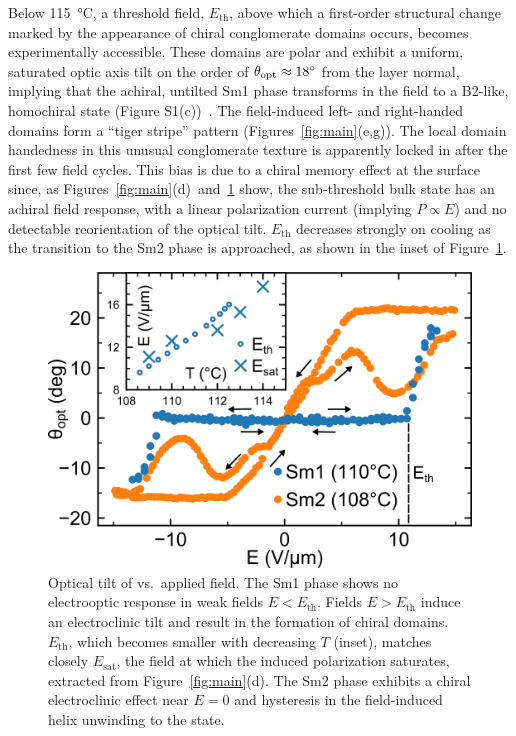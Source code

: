 Below \SI{115}{\degreeCelsius}, a threshold field, $E_\text{th}$, above which a first-order structural change marked by the appearance of chiral conglomerate domains occurs, becomes experimentally accessible.
These domains are polar and exhibit a uniform, saturated optic axis tilt on the
order of $\theta_{\rm opt} \approx \SI{18}{\degree}$ from the layer normal, implying that the achiral, untilted Sm1 phase
transforms in the field to a B2-like, homochiral  state (Figure
S1(c))~\cite{eremin2008electrically}. The field-induced left- and right-handed domains form a ``tiger stripe''
pattern (Figures~\ref{fig:main}(e,g)). The local domain handedness in this unusual conglomerate texture 
is apparently locked in after the first few field cycles.  This bias is due to a chiral
memory effect at the surface since, as
Figures~\ref{fig:main}(d)~and~\ref{fig:threshold} show, the
sub-threshold bulk state has an achiral field response, with a linear polarization current (implying $P \propto E$) and no
detectable reorientation of the optical tilt.
$E_\text{th}$  decreases strongly on cooling as the transition to the Sm2 phase is approached, as shown in the inset of Figure~\ref{fig:threshold}.
%
\begin{figure}[h]
    \includegraphics[width=\columnwidth]{./figs/pal30/finalFigs/threshold-inset2.png}
    \caption{\label{fig:threshold}
        Optical tilt of  vs.\ applied field. The Sm1
        phase shows no electrooptic response in weak fields $E<E_\text{th}$. Fields $E>E_\text{th}$ induce an electroclinic
        tilt and result in the formation of chiral domains.
        $E_\text{th}$, which becomes smaller with decreasing $T$ (inset), matches
        closely $E_\text{sat}$, the field at which the induced
        polarization saturates, extracted from Figure~\ref{fig:main}(d).
        The Sm2 phase exhibits a chiral
        electroclinic effect near $E=0$ and hysteresis in the field-induced helix unwinding to the
         state.   }

\end{figure}



